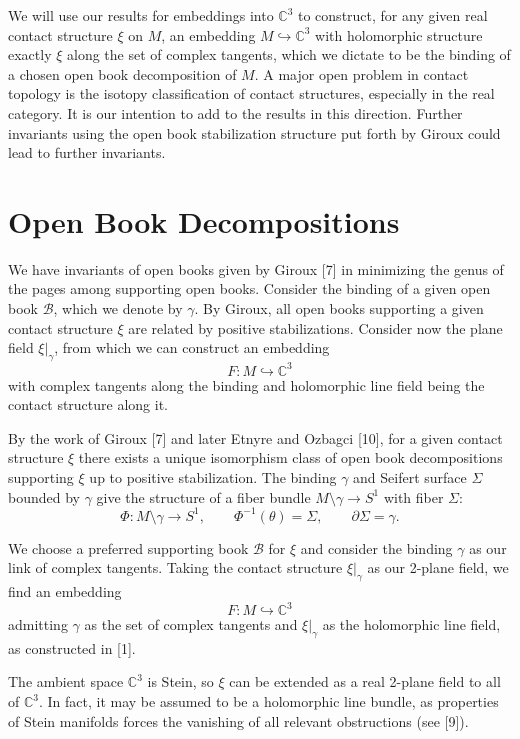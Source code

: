 \documentclass{amsart}
\newcommand{\C}{\mathbb{C}}
\begin{document}
We will use our results for embeddings into $\C^3$ to construct, for any given real contact structure $\xi$ on $M$, an embedding $M \hookrightarrow \C^3$ with holomorphic structure exactly $\xi$ along the set of complex tangents, which we dictate to be the binding of a chosen open book decomposition of $M$.
A major open problem in contact topology is the isotopy classification of contact structures, especially in the real category. It is our intention to add to the results in this direction. Further invariants using the open book stabilization structure put forth by Giroux could lead to further invariants.


\section{Open Book Decompositions}

We have invariants of open books given by Giroux [7] in minimizing the genus of the pages among supporting open books. Consider the binding of a given open book $\mathcal{B}$, which we denote by $\gamma$. By Giroux, all open books supporting a given contact structure $\xi$ are related by positive stabilizations.
Consider now the plane field $\xi|_\gamma$, from which we can construct an embedding
\[
F: M \hookrightarrow \C^3
\]
with complex tangents along the binding and holomorphic line field being the contact structure along it.

By the work of Giroux [7] and later Etnyre and Ozbagci [10], for a given contact structure $\xi$ there exists a unique isomorphism class of open book decompositions supporting $\xi$ up to positive stabilization. The binding $\gamma$ and Seifert surface $\Sigma$ bounded by $\gamma$ give the structure of a fiber bundle $M \setminus \gamma \to S^1$ with fiber $\Sigma$:
\[
\Phi: M \setminus \gamma \to S^1,\qquad \Phi^{-1}(\theta) = \Sigma,\qquad \partial \Sigma = \gamma.
\]

We choose a preferred supporting book $\mathcal{B}$ for $\xi$ and consider the binding $\gamma$ as our link of complex tangents. Taking the contact structure $\xi|_\gamma$ as our 2-plane field, we find an embedding
\[
F: M \hookrightarrow \C^3
\]
admitting $\gamma$ as the set of complex tangents and $\xi|_\gamma$ as the holomorphic line field, as constructed in [1].

The ambient space $\C^3$ is Stein, so $\xi$ can be extended as a real 2-plane field to all of $\C^3$. In fact, it may be assumed to be a holomorphic line bundle, as properties of Stein manifolds forces the vanishing of all relevant obstructions (see [9]).
\end{document}
